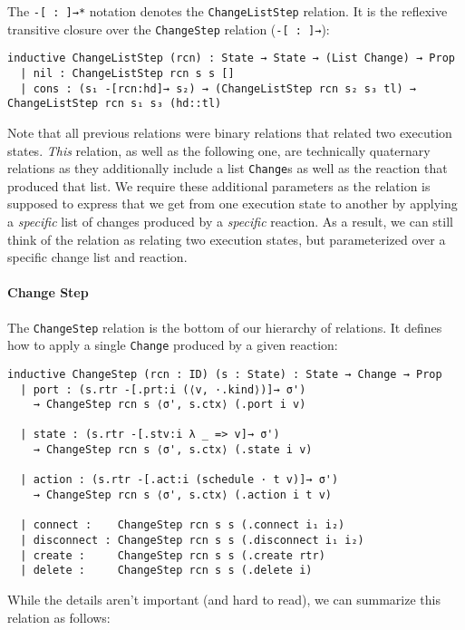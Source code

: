 The \lstinline{-[ : ]→*} notation denotes the \lstinline{ChangeListStep} relation.
It is the reflexive transitive closure over the \lstinline{ChangeStep} relation (\lstinline{-[ : ]→}):

\begin{lstlisting}
inductive ChangeListStep (rcn) : State → State → (List Change) → Prop
  | nil : ChangeListStep rcn s s []
  | cons : (s₁ -[rcn:hd]→ s₂) → (ChangeListStep rcn s₂ s₃ tl) → ChangeListStep rcn s₁ s₃ (hd::tl)
\end{lstlisting}

Note that all previous relations were binary relations that related two execution states.
\emph{This} relation, as well as the following one, are technically quaternary relations as they additionally include a list \lstinline{Change}s as well as the reaction that produced that list.
We require these additional parameters as the relation is supposed to express that we get from one execution state to another by applying a \emph{specific} list of changes produced by a \emph{specific} reaction.
As a result, we can still think of the relation as relating two execution states, but parameterized over a specific change list and reaction.

\paragraph{Change Step}

The \lstinline{ChangeStep} relation is the bottom of our hierarchy of relations.
It defines how to apply a single \lstinline{Change} produced by a given reaction:

\begin{lstlisting}
inductive ChangeStep (rcn : ID) (s : State) : State → Change → Prop 
  | port : (s.rtr -[.prt:i (⟨v, ·.kind⟩)]→ σ')    
    → ChangeStep rcn s ⟨σ', s.ctx⟩ (.port i v)

  | state : (s.rtr -[.stv:i λ _ => v]→ σ')
    → ChangeStep rcn s ⟨σ', s.ctx⟩ (.state i v)

  | action : (s.rtr -[.act:i (schedule · t v)]→ σ')
    → ChangeStep rcn s ⟨σ', s.ctx⟩ (.action i t v)

  | connect :    ChangeStep rcn s s (.connect i₁ i₂)
  | disconnect : ChangeStep rcn s s (.disconnect i₁ i₂)
  | create :     ChangeStep rcn s s (.create rtr)
  | delete :     ChangeStep rcn s s (.delete i)  
\end{lstlisting}

While the details aren't important (and hard to read), we can summarize this relation as follows:

